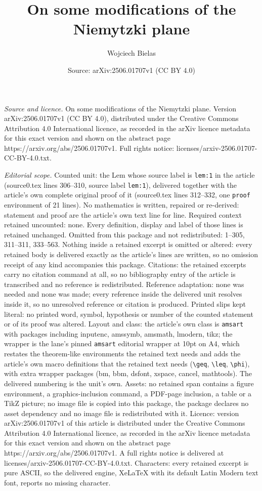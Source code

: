 \documentclass[10pt,a4paper]{amsart}
\title[On some modifications of the Niemytzki plane]{On some modifications of the Niemytzki plane}
\author{Wojciech Bielas}
\date{Source: arXiv:2506.01707v1 (CC BY 4.0)}
\begin{document}
\maketitle

\noindent\emph{Source and licence.} On some modifications of the Niemytzki plane. Version arXiv:2506.01707v1 (CC BY 4.0), distributed under the Creative Commons Attribution 4.0 International licence, as recorded in the arXiv licence metadata for this exact version and shown on the abstract page https://arxiv.org/abs/2506.01707v1. Full rights notice: licenses/arxiv-2506.01707-CC-BY-4.0.txt.\par\smallskip

\noindent\textit{Editorial scope.} Counted unit: the Lem whose source label is \texttt{lem:1} in the article (source0.tex lines 306--310, source label \texttt{lem:1}), delivered together with the article's own complete original proof of it (source0.tex lines 312--332, one \texttt{proof} environment of 21 lines). No mathematics is written, repaired or re-derived: statement and proof are the article's own text line for line. Required context retained uncounted: none. Every definition, display and label of those lines is retained unchanged. Omitted from this package and not redistributed: 1--305, 311--311, 333--563. Nothing inside a retained excerpt is omitted or altered: every retained body is delivered exactly as the article's lines are written, so no omission receipt of any kind accompanies this package. Citations: the retained excerpts carry no citation command at all, so no bibliography entry of the article is transcribed and no reference is redistributed. Reference adaptation: none was needed and none was made; every reference inside the delivered unit resolves inside it, so no unresolved reference or citation is produced. Printed slips kept literal: no printed word, symbol, hypothesis or number of the counted statement or of its proof was altered. Layout and class: the article's own class is \texttt{amsart} with packages including inputenc, amssymb, amsmath, lmodern, tikz; the wrapper is the lane's pinned \texttt{amsart} editorial wrapper at 10pt on A4, which restates the theorem-like environments the retained text needs and adds the article's own macro definitions that the retained text needs (\texttt{\textbackslash geq}, \texttt{\textbackslash leq}, \texttt{\textbackslash phi}), with extra wrapper packages (bm, bbm, dsfont, xspace, cancel, mathtools). The delivered numbering is the unit's own. Assets: no retained span contains a figure environment, a graphics-inclusion command, a PDF-page inclusion, a table or a TikZ picture; no image file is copied into this package, the package declares no asset dependency and no image file is redistributed with it. Licence: version arXiv:2506.01707v1 of this article is distributed under the Creative Commons Attribution 4.0 International licence, as recorded in the arXiv licence metadata for this exact version and shown on the abstract page https://arxiv.org/abs/2506.01707v1. A full rights notice is delivered at licenses/arxiv-2506.01707-CC-BY-4.0.txt. Characters: every retained excerpt is pure ASCII, so the delivered engine, XeLaTeX with its default Latin Modern text font, reports no missing character.
\end{document}
